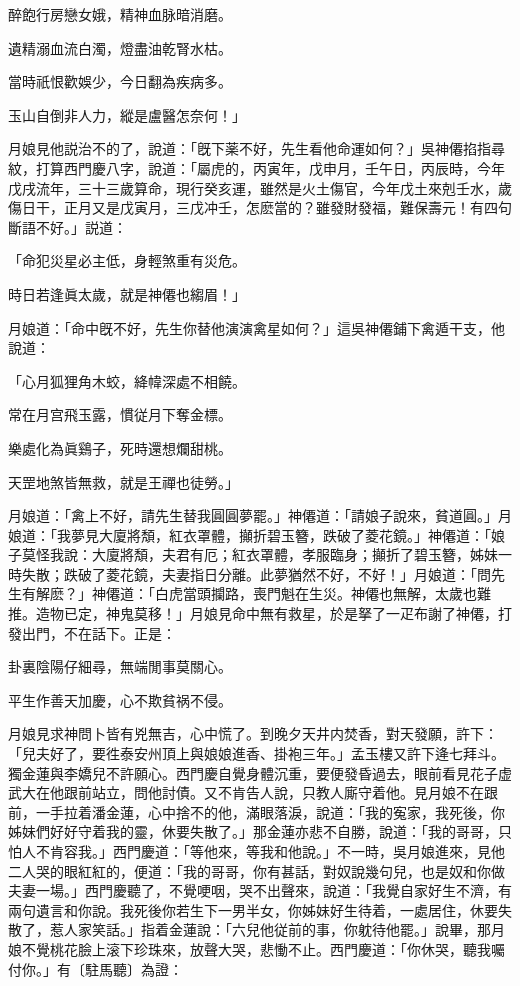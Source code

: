 \begin{myquote}
醉飽行房戀女娥，精神血脉暗消磨。

遺精溺血流白濁，燈盡油乾腎水枯。

當時祇恨歡娛少，今日翻為疾病多。

玉山自倒非人力，縱是盧醫怎奈何！」
\end{myquote}

月娘見他説治不的了，說道：「旣下薬不好，先生看他命運如何？」吳神僊掐指尋紋，打算西門慶八字，說道：「屬虎的，丙寅年，戊申月，壬午日，丙辰時，今年戊戌流年，三十三歲算命，現行癸亥運，雖然是火土傷官，今年戊土來剋壬水，歲傷日干，正月又是戊寅月，三戊冲壬，怎麽當的？雖發財發福，難保壽元！有四句斷語不好。」説道：

\begin{myquote}
「命犯災星必主低，身輕煞重有災危。

時日若逢眞太歲，就是神僊也縐眉！」
\end{myquote}

月娘道：「命中旣不好，先生你替他演演禽星如何？」這吳神僊鋪下禽遁干支，他說道：

\begin{myquote}
「心月狐狸角木蛟，絳幃深處不相饒。

常在月宫飛玉露，慣従月下奪金標。

樂處化為眞鷄子，死時還想爛甜桃。

天罡地煞皆無救，就是王禪也徒勞。」
\end{myquote}

月娘道：「禽上不好，請先生替我圓圓夢罷。」神僊道：「請娘子說來，貧道圓。」月娘道：「我夢見大廈將頽，紅衣罩體，攧折碧玉簪，跌破了菱花鏡。」神僊道：「娘子莫怪我說：大廈將頽，夫君有厄；紅衣罩體，孝服臨身；攧折了碧玉簪，姊妹一時失散；跌破了菱花鏡，夫妻指日分離。此夢猶然不好，不好！」月娘道：「問先生有解麽？」神僊道：「白虎當頭攔路，喪門魁在生災。神僊也無解，太歲也難推。造物已定，神鬼莫移！」月娘見命中無有救星，於是拏了一疋布謝了神僊，打發出門，不在話下。正是：

\begin{myquote}
卦裏陰陽仔細尋，無端閒事莫關心。

平生作善天加慶，心不欺貧祸不侵。
\end{myquote}

月娘見求神問卜皆有兇無吉，心中慌了。到晚夕天井内焚香，對天發願，許下：「兒夫好了，要徃泰安州頂上與娘娘進香、掛袍三年。」孟玉樓又許下逄七拜斗。獨金蓮與李嬌兒不許願心。西門慶自覺身體沉重，要便發昏過去，眼前看見花子虚武大在他跟前站立，問他討債。又不肯告人說，只教人廝守着他。見月娘不在跟前，一手拉着潘金蓮，心中捨不的他，滿眼落淚，說道：「我的寃家，我死後，你姊妹們好好守着我的靈，休要失散了。」那金蓮亦悲不自勝，說道：「我的哥哥，只怕人不肯容我。」西門慶道：「等他來，等我和他說。」不一時，吳月娘進來，見他二人哭的眼紅紅的，便道：「我的哥哥，你有甚話，對奴說幾句兒，也是奴和你做夫妻一場。」西門慶聽了，不覺哽咽，哭不出聲來，說道：「我覺自家好生不濟，有兩句遺言和你說。我死後你若生下一男半女，你姊妹好生待着，一處居住，休要失散了，惹人家笑話。」指着金蓮說：「六兒他従前的事，你躭待他罷。」說畢，那月娘不覺桃花臉上滚下珍珠來，放聲大哭，悲慟不止。西門慶道：「你休哭，聽我囑付你。」有〔駐馬聽〕為證：


